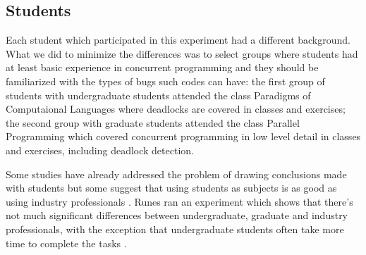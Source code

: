 \subsection{Students}

Each student which participated in this experiment had a different background. What we did to minimize the differences was to select groups where students had at least basic experience in concurrent programming and they should be familiarized with the types of bugs such codes can have: the first group of students with undergraduate students attended the class Paradigms of Computaional Languages where deadlocks are covered in classes and exercises; the second group with graduate students attended the class Parallel Programming which covered concurrent programming in low level detail in classes and exercises, including deadlock detection.

Some studies have already addressed the problem of drawing conclusions made with students but some suggest that using students as subjects is as good as using industry professionals \cite{staron}. Runes ran an experiment which shows that there's not much significant differences between undergraduate, graduate and industry professionals, with the exception that undergraduate students often take more time to complete the tasks \cite{runes}.




